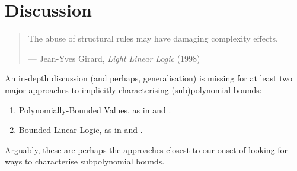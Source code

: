 \chapter{Discussion}

\begin{quotation}

\footnotesize\sffamily\itshape

\begin{flushright}

The abuse of structural rules may have damaging complexity effects.

\smallbreak

\upshape

--- Jean-Yves Girard, {\itshape Light Linear Logic} (1998)

\end{flushright}

\end{quotation}

An in-depth discussion (and perhaps, generalisation) is missing for at least
two major approaches to implicitly characterising (sub)polynomial bounds:

\begin{enumerate}[label=(\arabic*)]

\item Polynomially-Bounded Values, as in \cite{niggl-wunderlich-2006} and
\cite{jones-kristiansen-2009}.

\item Bounded Linear Logic, as in \cite{girard-scedorov-scott-1992} and
\cite{dal-lago-hofmann-2010}.

\end{enumerate}

Arguably, these are perhaps the approaches closest to our onset of looking for
ways to characterise subpolynomial bounds.
